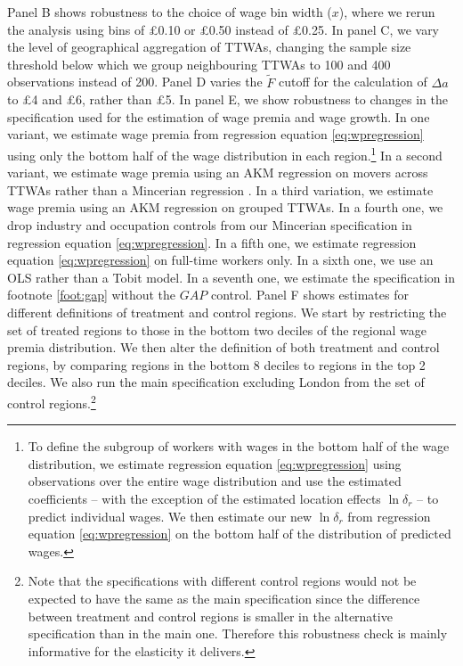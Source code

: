 Panel B shows robustness to the choice of wage bin width ($x$), where we rerun the analysis using bins of \pounds 0.10 or \pounds 0.50 instead of \pounds 0.25. In panel C, we vary the level of geographical aggregation of TTWAs, changing the sample size threshold below which we group neighbouring TTWAs to 100 and 400 observations instead of 200. Panel D varies the $\tilde{F}$ cutoff for the calculation of $\Delta{a}$ to \pounds 4 and \pounds 6, rather than \pounds 5. In panel E, we show robustness to changes in the specification used for the estimation of wage premia and wage growth. In one variant, we estimate wage premia from regression equation \ref{eq:wpregression} using only the bottom half of the wage distribution in each region.\footnote{To define the subgroup of workers with wages in the bottom half of the wage distribution, we estimate regression equation \ref{eq:wpregression} using observations over the entire wage distribution and use the estimated coefficients -- with the exception of the estimated location effects $\ln \delta_r$ -- to predict individual wages. We then estimate our new $\ln \delta_r$ from regression equation \ref{eq:wpregression} on the bottom half of the distribution of predicted wages.} In a second variant, we estimate wage premia using an AKM regression on movers across TTWAs rather than a Mincerian regression \citep{Abowd1999}. In a third variation, we estimate wage premia using an AKM regression on grouped TTWAs. In a fourth one, we drop industry and occupation controls from our Mincerian specification in regression equation \ref{eq:wpregression}. In a fifth one, we estimate regression equation \ref{eq:wpregression} on full-time workers only. In a sixth one, we use an OLS rather than a Tobit model. In a seventh one, we estimate the specification in footnote \ref{foot:gap} without the $GAP$ control. Panel F shows estimates for different definitions of treatment and control regions. We start by restricting the set of treated regions to those in the bottom two deciles of the regional wage premia distribution. We then alter the definition of both treatment and control regions, by comparing regions in the bottom 8 deciles to regions in the top 2 deciles. We also run the main specification excluding London from the set of control regions.\footnote{Note that the specifications with different control regions would not be expected to have the same  as the main specification since the difference between treatment and control regions is smaller in the alternative specification than in the main one. Therefore this robustness check is mainly informative for the elasticity it delivers.}

